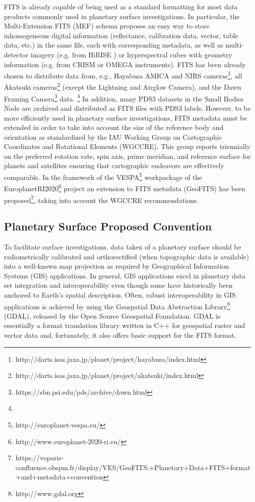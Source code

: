 FITS is already capable of being used as a standard formatting for most data products
commonly used in planetary surface investigations.
In particular, the Multi-Extension FITS (MEF) schema proposes an easy way
to store inhomogeneous digital information (reflectance, calibration data,
vector, table data, etc.) in the same file, each with corresponding metadata,
as well as multi-detector imagery (e.g. from HiRISE \citep{hirise})
or hyperspectral cubes with geometry information (e.g. from CRISM
\citep{crism} or OMEGA \citep{omega} instruments).
FITS has been already chosen to distribute data from, e.g.,
Hayabusa AMICA and NIRS cameras\footnote{http://darts.isas.jaxa.jp/planet/project/hayabusa/index.html},
all Akatsuki cameras\footnote{http://darts.isas.jaxa.jp/planet/project/akatsuki/index.html}
(except the Lightning and Airglow Camera),
and the Dawn Framing Camera\footnote{https://sbn.psi.edu/pds/archive/dawn.html} data.
\DIFaddbegin {}\footnote{} \DIFaddend In addition, many PDS3 datasets in the Small Bodies Node are archived and distributed
as FITS files with PDS3 labels.
However, to be more efficiently used in planetary surface investigations, FITS metadata
must be extended in order to take into account the size of the reference body and
orientation as standardized by the IAU Working Group on Cartographic Coordinates and
Rotational Elements (WGCCRE).
This group reports triennially \citep{wgccre} on the preferred rotation rate,
spin axis, prime meridian, and reference surface for planets and satellites
ensuring that cartographic endeavors are effectively comparable.
In the framework of the VESPA\footnote{http://europlanet-vespa.eu/}
\citep{vespapss} workpackage of the EuroplanetRI2020\footnote{http://www.europlanet-2020-ri.eu/}
project an extension to FITS metadata (GeoFITS) has been
proposed\footnote{https://voparis-confluence.obspm.fr/display/VES/GeoFITS:+Planetary+Data+FITS+format+and+metadata+convention},
taking into account the WGCCRE recommendations.

\subsection{Planetary Surface Proposed Convention}
\label{ssec:geofits}
To facilitate surface investigations, data taken of a planetary surface should be
radiometrically calibrated and orthorectified (when topographic data is available)
into a well-known map projection as required by Geographical Information Systems (GIS)
applications.
In general, GIS applications excel in planetary data set integration and 
interoperability even though some have historically been anchored to Earth's spatial
description.
Often, robust interoperability in GIS applications is achieved by using the Geospatial
Data Abstraction Library\footnote{http://www.gdal.org} (GDAL), released by the Open
Source Geospatial Foundation.
GDAL is essentially a format translation library written in C++ for geospatial raster
and vector data and, fortunately, it also offers basic support for the FITS format\DIFaddbegin {}\DIFaddend . 


